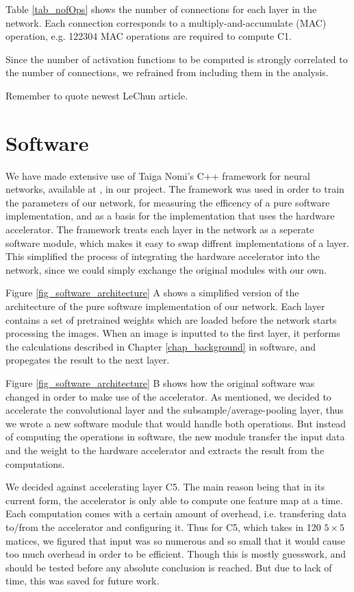 Table \ref{tab_nofOps} shows the number of connections for each layer in the network. Each connection corresponds to a multiply-and-accumulate (MAC) operation, e.g. 122304 MAC operations are required to compute C1. 

Since the number of activation functions to be computed is strongly correlated to the number of connections, we refrained from including them in the analysis. 


Remember to quote newest LeChun article. 

\section{Software}

We have made extensive use of Taiga Nomi's C++ framework for neural networks, available at \cite{SoftwareGithub}, in our project. The framework was used in order to train the parameters of our network, for measuring the efficency of a pure software implementation, and as a basis for the implementation that uses the hardware accelerator. The framework treats each layer in the network as a seperate software module, which makes it easy to swap diffrent implementations of a layer. This simplified the process of integrating the hardware accelerator into the network, since we could simply exchange the original modules with our own.

Figure \ref{fig_software_architecture} A shows a simplified version of the architecture of the pure software implementation of our network. Each layer contains a set of pretrained weights which are loaded before the network starts processing the images. When an image is inputted to the first layer, it performs the calculations described in Chapter \ref{chap_background} in software, and propegates the result to the next layer. 

Figure \ref{fig_software_architecture} B shows how the original software was changed in order to make use of the accelerator. As mentioned, we decided to accelerate the convolutional layer and the subsample/average-pooling layer, thus we wrote a new software module that would handle both operations. But instead of computing the operations in software, the new module transfer the input data and the weight to the hardware accelerator and extracts the result from the computations. 

We decided against accelerating layer C5. The main reason being that in its current form, the accelerator is only able to compute one feature map at a time. Each computation comes with a certain amount of overhead, i.e. transfering data to/from the accelerator and configuring it. Thus for C5, which takes in 120 $ 5 \times 5 $ matices, we figured that input was so numerous and so small that it would cause too much overhead in order to be efficient. Though this is mostly guesswork, and should be tested before any absolute conclusion is reached. But due to lack of time, this was saved for future work. 


